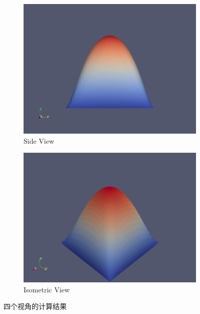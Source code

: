 \documentclass[12pt, a4paper]{article}
\numberwithin{equation}{section} %
\begin{document}
\begin{figure}[htbp]
    \begin{subfigure}{0.48\textwidth}
        \centering
        \includegraphics[width=\textwidth]{proj3.png}
        \caption{Side View}
        \label{fig:side_view}
    \end{subfigure}
    \hfill
    \begin{subfigure}{0.48\textwidth}
        \centering
        \includegraphics[width=\textwidth]{proj4.png}
        \caption{Isometric View}
        \label{fig:isometric_view}
    \end{subfigure}
    
    \caption{四个视角的计算结果}
    \label{fig:four_views}
\end{figure}
\end{document}
